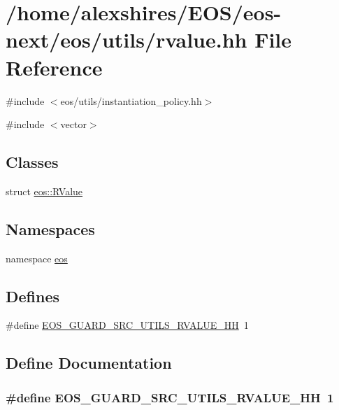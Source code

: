 \hypertarget{rvalue_8hh}{
\section{/home/alexshires/EOS/eos-\/next/eos/utils/rvalue.hh File Reference}
\label{rvalue_8hh}
}
{\ttfamily \#include $<$eos/utils/instantiation\_\-policy.hh$>$}\par
{\ttfamily \#include $<$vector$>$}\par
\subsection*{Classes}
\begin{DoxyCompactItemize}
\item 
struct \hyperlink{structeos_1_1RValue}{eos::RValue}
\end{DoxyCompactItemize}
\subsection*{Namespaces}
\begin{DoxyCompactItemize}
\item 
namespace \hyperlink{namespaceeos}{eos}
\end{DoxyCompactItemize}
\subsection*{Defines}
\begin{DoxyCompactItemize}
\item 
\#define \hyperlink{rvalue_8hh_a8ef0afd2cbe807deba1d15618b3af72a}{EOS\_\-GUARD\_\-SRC\_\-UTILS\_\-RVALUE\_\-HH}~1
\end{DoxyCompactItemize}


\subsection{Define Documentation}
\hypertarget{rvalue_8hh_a8ef0afd2cbe807deba1d15618b3af72a}{
\subsubsection[{EOS\_\-GUARD\_\-SRC\_\-UTILS\_\-RVALUE\_\-HH}]{\setlength{\rightskip}{0pt plus 5cm}\#define EOS\_\-GUARD\_\-SRC\_\-UTILS\_\-RVALUE\_\-HH~1}}
\label{rvalue_8hh_a8ef0afd2cbe807deba1d15618b3af72a}
